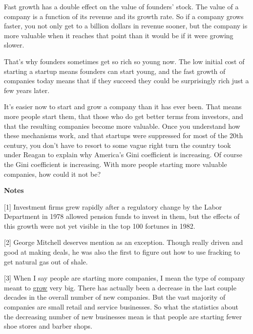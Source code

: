 Fast growth has a double effect on the value of
                  founders' stock. The value of a company is a function of its
                  revenue and its growth rate. So if a company grows faster, you
                  not only get to a billion dollars in revenue sooner, but the
                  company is more valuable when it reaches that point than it
                  would be if it were growing slower.

That's why
                  founders sometimes get so rich so young now. The low initial
                  cost of starting a startup means founders can start young, and
                  the fast growth of companies today means that if they succeed
                  they could be surprisingly rich just a few years later.

It's
                  easier now to start and grow a company than it has ever been.
                  That means more people start them, that those who do get
                  better terms from investors, and that the resulting companies
                  become more valuable. Once you understand how these mechanisms
                  work, and that startups were suppressed for most of the 20th
                  century, you don't have to resort to some vague right turn the
                  country took under Reagan to explain why America's Gini
                  coefficient is increasing. Of course the Gini coefficient is
                  increasing. With more people starting more valuable companies,
                  how could it not be?











\textbf{Notes}

[1] Investment firms grew rapidly after a regulatory change by
                  the Labor Department in 1978 allowed pension funds to invest
                  in them, but the effects of this growth were not yet visible
                  in the top 100 fortunes in 1982.

[2] George Mitchell deserves mention as an exception. Though
                  really driven and good at making deals, he was also the first
                  to figure out how to use fracking to get natural gas out of
                  shale.

[3] When I say people are starting more companies, I mean the
                  type of company meant to
                  \href{http://www.paulgraham.com/growth.html}{\underline{grow}} very big. There has
                  actually been a decrease in the last couple decades in the
                  overall number of new companies. But the vast majority of
                  companies are small retail and service businesses. So what the
                  statistics about the decreasing number of new businesses mean
                  is that people are starting fewer shoe stores and barber
                  shops.

